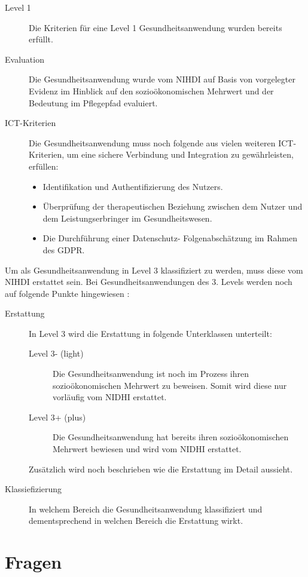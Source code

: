 \documentclass{article}
\begin{document}
			\begin{description}
				\item[Level 1] Die Kriterien für eine Level 1 Gesundheitsanwendung wurden bereits erfüllt.
				\item[Evaluation] Die Gesundheitsanwendung wurde vom NIHDI auf Basis von vorgelegter Evidenz im Hinblick auf den sozioökonomischen Mehrwert und der Bedeutung im Pflegepfad evaluiert. 
				\item[ICT-Kriterien] Die Gesundheitsanwendung muss noch folgende aus vielen weiteren ICT-Kriterien, um eine sichere Verbindung und Integration zu gewährleisten, erfüllen:
					\begin{itemize}
						\item Identifikation und Authentifizierung des Nutzers.
						\item Überprüfung der therapeutischen Beziehung zwischen dem Nutzer und dem Leistungserbringer im Gesundheitswesen.
						\item Die Durchführung einer Datenschutz- Folgenabschätzung im Rahmen des GDPR.
					\end{itemize}
			\end{description}
			Um als Gesundheitsanwendung in Level 3 klassifiziert zu werden, muss diese vom NIHDI erstattet sein. Bei Gesundheitsanwendungen des 3. Levels werden noch auf folgende Punkte hingewiesen \cite{belgien-pyramide}:
			\begin{description}
				\item[Erstattung] In Level 3 wird die Erstattung in folgende Unterklassen unterteilt:
					\begin{description}
						\item[Level 3- (light)] Die Gesundheitsanwendung ist noch im Prozess ihren sozioökonomischen Mehrwert zu beweisen. Somit wird diese nur vorläufig vom NIDHI erstattet.
						\item[Level 3+ (plus)] Die Gesundheitsanwendung hat bereits ihren sozioökonomischen Mehrwert bewiesen und wird vom NIDHI erstattet.
					\end{description}
				Zusätzlich wird noch beschrieben wie die Erstattung im Detail aussieht.
				\item[Klassiefizierung] In welchem Bereich die Gesundheitsanwendung klassifiziert und dementsprechend in welchen Bereich die Erstattung wirkt. 
			\end{description} 
			
			\newpage		
	\section{Fragen}
\end{document}

